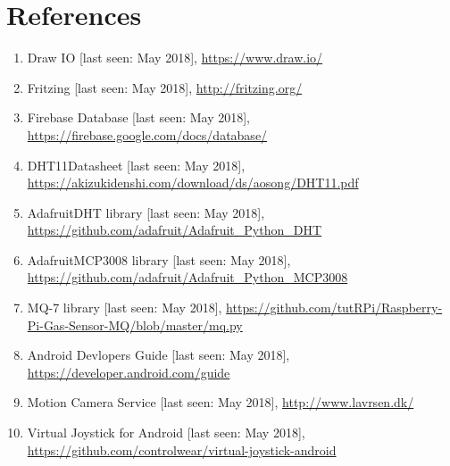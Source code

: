 \documentclass[a4paper,11pt]{article}
\begin{document}
\newpage
\section{References}
\begin{enumerate}
\item Draw IO [last seen: May 2018], \url{https://www.draw.io/}
\item Fritzing [last seen: May 2018], \url{http://fritzing.org/}
\item Firebase Database [last seen: May 2018], \url{https://firebase.google.com/docs/database/}
\item DHT11Datasheet [last seen: May 2018], \url{https://akizukidenshi.com/download/ds/aosong/DHT11.pdf}
\item AdafruitDHT library [last seen: May 2018], \url{https://github.com/adafruit/Adafruit\_Python\_DHT}
\item AdafruitMCP3008 library [last seen: May 2018], \url{https://github.com/adafruit/Adafruit\_Python\_MCP3008}
\item MQ-7 library [last seen: May 2018], \url{https://github.com/tutRPi/Raspberry-Pi-Gas-Sensor-MQ/blob/master/mq.py}
\item Android Devlopers Guide [last seen: May 2018], \url{https://developer.android.com/guide}
\item Motion Camera Service [last seen: May 2018], \url{http://www.lavrsen.dk/}
\item Virtual Joystick for Android [last seen: May 2018], \url{https://github.com/controlwear/virtual-joystick-android}
\end{enumerate}
\end{document}

